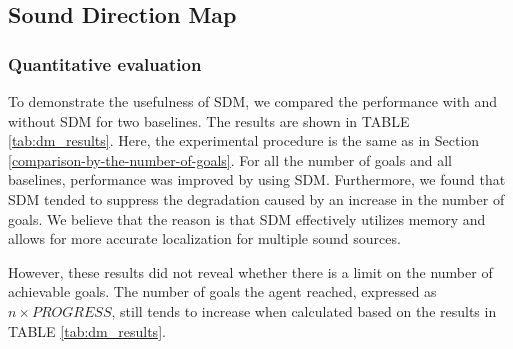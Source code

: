 \subsection{Sound Direction Map}



\subsubsection{Quantitative evaluation}

To demonstrate the usefulness of SDM, we compared the performance with and without SDM for two baselines.
The results are shown in TABLE \ref{tab:dm_results}.
Here, the experimental procedure is the same as in Section \ref{comparison-by-the-number-of-goals}.
For all the number of goals and all baselines, performance was improved by using SDM.
Furthermore, we found that SDM tended to suppress the degradation caused by an increase in the number of goals.
We believe that the reason is that SDM effectively utilizes memory and allows for more accurate localization for multiple sound sources.

However, these results did not reveal whether there is a limit on the number of achievable goals. The number of goals the agent reached, expressed as $n \times PROGRESS$, still tends to increase when calculated based on the results in TABLE \ref{tab:dm_results}.

